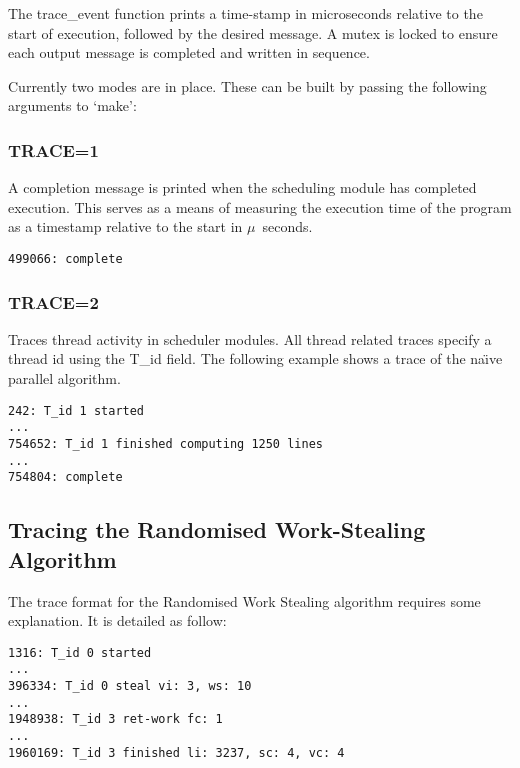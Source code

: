 The trace\_event function prints a time-stamp in microseconds relative to the start of execution,
followed by the desired message. A mutex is locked to ensure each output message
is completed and written in sequence.

Currently two modes are in place.
These can be built by passing the following arguments to `make':
\subsubsection*{TRACE=1}
            A completion message is printed when the scheduling module has completed execution.
            This serves as a means of measuring the execution time of the program as a timestamp
            relative to the start in \(\mu\)~seconds.
            
\begin{lstlisting}
499066: complete
\end{lstlisting}


\subsubsection*{TRACE=2}
            Traces thread activity in scheduler modules. 
            All thread related traces specify a thread id using the T\_id field.
            The following example shows a trace of the na\"{\i}ve parallel algorithm.
            
\begin{lstlisting}
242: T_id 1 started
...
754652: T_id 1 finished computing 1250 lines
...
754804: complete
\end{lstlisting}

\subsection*{Tracing the Randomised Work-Stealing Algorithm}

The trace format for the Randomised Work Stealing algorithm requires some explanation.
It is detailed as follow:
\newpage
\begin{lstlisting}[label = ls:wstraceeg,caption = Examples of the Four Traced Events for the Randomised Work-Stealing Scheme]
1316: T_id 0 started
...
396334: T_id 0 steal vi: 3, ws: 10
...
1948938: T_id 3 ret-work fc: 1
...
1960169: T_id 3 finished li: 3237, sc: 4, vc: 4
\end{lstlisting}

